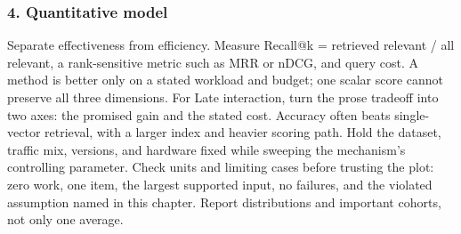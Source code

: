 \subsubsection*{4. Quantitative model}
Separate effectiveness from efficiency. Measure Recall@k = retrieved relevant / all relevant, a rank-sensitive metric such as MRR or nDCG, and query cost. A method is better only on a stated workload and budget; one scalar score cannot preserve all three dimensions.
For Late interaction, turn the prose tradeoff into two axes: the promised gain and the stated cost. Accuracy often beats single-vector retrieval, with a larger index and heavier scoring path. Hold the dataset, traffic mix, versions, and hardware fixed while sweeping the mechanism's controlling parameter.
Check units and limiting cases before trusting the plot: zero work, one item, the largest supported input, no failures, and the violated assumption named in this chapter. Report distributions and important cohorts, not only one average.
